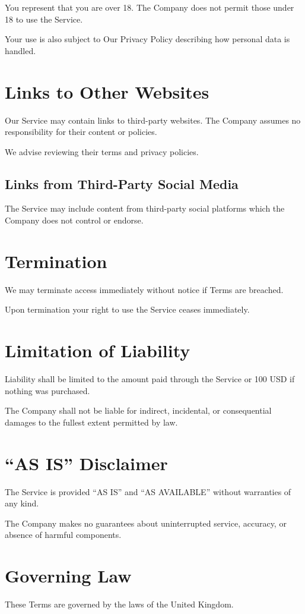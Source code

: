 \documentclass[11pt, a4paper]{report}
\begin{document}
You represent that you are over 18. The Company does not permit those under 18 to use the Service.

Your use is also subject to Our Privacy Policy describing how personal data is handled.

\section*{Links to Other Websites}
Our Service may contain links to third-party websites. The Company assumes no responsibility for their content or policies.

We advise reviewing their terms and privacy policies.

\subsection*{Links from Third-Party Social Media}
The Service may include content from third-party social platforms which the Company does not control or endorse.

\section*{Termination}
We may terminate access immediately without notice if Terms are breached.

Upon termination your right to use the Service ceases immediately.

\section*{Limitation of Liability}
Liability shall be limited to the amount paid through the Service or 100 USD if nothing was purchased.

The Company shall not be liable for indirect, incidental, or consequential damages to the fullest extent permitted by law.

\section*{``AS IS'' Disclaimer}
The Service is provided ``AS IS'' and ``AS AVAILABLE'' without warranties of any kind.

The Company makes no guarantees about uninterrupted service, accuracy, or absence of harmful components.

\section*{Governing Law}
These Terms are governed by the laws of the United Kingdom.
\end{document}
